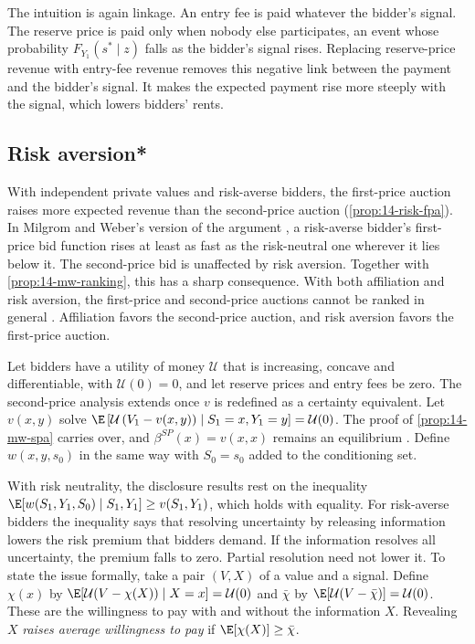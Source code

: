 The intuition is again linkage. An entry fee is paid whatever the bidder's signal. The reserve price is paid
only when nobody else participates, an event whose probability $F_{Y_1}(s^*\mid z)$ falls as the bidder's
signal rises. Replacing reserve-price revenue with entry-fee revenue removes this negative link between the
payment and the bidder's signal. It makes the expected payment rise more steeply with the signal, which lowers
bidders' rents.

\subsection{Risk aversion*}\label{sec:14-mw-risk}

With independent private values and risk-averse bidders, the first-price auction raises more expected revenue
than the second-price auction (\cref{prop:14-risk-fpa}). In Milgrom and Weber's version of the argument
\citep[eq.~(11)]{MilgromWeber1982}, a risk-averse bidder's first-price bid function rises at least as fast as
the risk-neutral one wherever it lies below it. The second-price bid is unaffected by risk aversion. Together
with \cref{prop:14-mw-ranking}, this has a sharp consequence. With both affiliation and risk aversion, the
first-price and second-price auctions cannot be ranked in general \citep[p.~1114]{MilgromWeber1982}.
Affiliation favors the second-price auction, and risk aversion favors the first-price auction.

Let bidders have a utility of money $\mathcal U$ that is increasing, concave and differentiable, with
$\mathcal U(0)=0$, and let reserve prices and entry fees be zero. The second-price analysis extends once
$v$ is redefined as a certainty equivalent. Let $v(x,y)$ solve
$\E\left[\mathcal U\left(V_1-v(x,y)\right)\mid S_1=x,Y_1=y\right]=\mathcal U(0)$. The proof of
\cref{prop:14-mw-spa} carries over, and $\beta^{SP}(x)=v(x,x)$ remains an equilibrium
\citep[p.~1115]{MilgromWeber1982}. Define $w(x,y,s_0)$ in the same way with $S_0=s_0$ added to the conditioning
set.

With risk neutrality, the disclosure results rest on the inequality
$\E[w(S_1,Y_1,S_0)\mid S_1,Y_1]\ge v(S_1,Y_1)$, which holds with equality. For risk-averse bidders the inequality
says that resolving uncertainty by releasing information lowers the risk premium that bidders demand. If the
information resolves all uncertainty, the premium falls to zero. Partial resolution need not lower it. To state
the issue formally, take a pair $(V,X)$ of a value and a signal. Define $\chi(x)$ by
$\E[\mathcal U(V-\chi(X))\mid X=x]=\mathcal U(0)$ and $\bar\chi$ by $\E[\mathcal U(V-\bar\chi)]=\mathcal
U(0)$. These are the willingness to pay with and without the information $X$. Revealing $X$ \emph{raises
average willingness to pay} if $\E[\chi(X)]\ge\bar\chi$.

